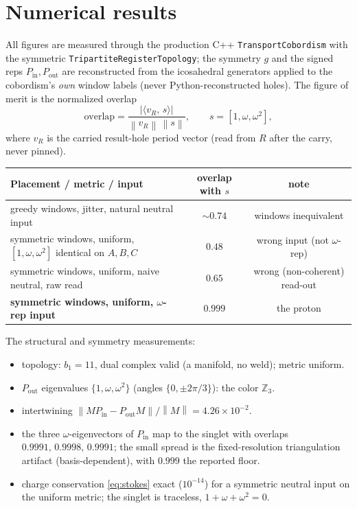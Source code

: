 \documentclass[11pt]{article}
\theoremstyle{definition}
\newcommand{\Z}{\mathbb{Z}}
\newcommand{\abs}[1]{\left\lvert #1 \right\rvert}
\newcommand{\norm}[1]{\left\lVert #1 \right\rVert}
\newcommand{\Pin}{P_{\mathrm{in}}}
\newcommand{\Pout}{P_{\mathrm{out}}}
\begin{document}
\section{Numerical results}
\label{sec:results}

All figures are measured through the production C++ \texttt{TransportCobordism} with
the symmetric \texttt{TripartiteRegisterTopology}; the symmetry $g$ and the signed reps
$\Pin,\Pout$ are reconstructed from the icosahedral generators applied to the
cobordism's \emph{own} window labels (never Python-reconstructed holes). The figure of
merit is the normalized overlap
\begin{equation}
  \text{overlap} = \frac{\abs{\langle v_R,\,s\rangle}}{\norm{v_R}\,\norm{s}},
  \qquad s=[1,\omega,\omega^2],
  \label{eq:overlap}
\end{equation}
where $v_R$ is the carried result-hole period vector (read from $R$ after the carry,
never pinned).

\begin{center}
\setlength{\tabcolsep}{5pt}
\begin{tabular}{@{}p{6.6cm}cc@{}}
\toprule
Placement / metric / input & overlap with $s$ & note\\
\midrule
greedy windows, jitter, natural neutral input        & $\sim 0.74$ & windows inequivalent\\
symmetric windows, uniform, $[1,\omega,\omega^2]$ identical on $A,B,C$ & $0.48$ & wrong input (not $\omega$-rep)\\
symmetric windows, uniform, naive neutral, raw read  & $0.65$ & wrong (non-coherent) read-out\\
\textbf{symmetric windows, uniform, $\omega$-rep input} & $\mathbf{0.999}$ & the proton\\
\bottomrule
\end{tabular}
\end{center}

\noindent The structural and symmetry measurements:
\begin{itemize}[nosep]
  \item topology: $b_1=11$, dual complex valid (a manifold, no weld); metric uniform.
  \item $\Pout$ eigenvalues $\{1,\omega,\omega^2\}$ (angles $\{0,\pm2\pi/3\}$): the color $\Z_3$.
  \item intertwining $\norm{M\Pin-\Pout M}/\norm{M} = 4.26\times10^{-2}$.
  \item the three $\omega$-eigenvectors of $\Pin$ map to the singlet with overlaps
        $0.9991,\,0.9998,\,0.9991$; the small spread is the fixed-resolution
        triangulation artifact (basis-dependent), with $0.999$ the reported floor.
  \item charge conservation \eqref{eq:stokes} exact ($10^{-14}$) for a symmetric
        neutral input on the uniform metric; the singlet is traceless,
        $1+\omega+\omega^2=0$.
\end{itemize}
\end{document}
